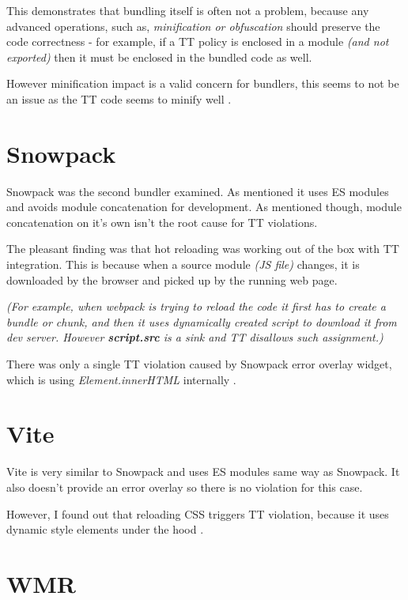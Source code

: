 This demonstrates that bundling itself is often not a problem, because any advanced operations, such
as, \emph{minification or obfuscation} should preserve the code correctness - for example, if a TT
policy is enclosed in a module \emph{(and not exported)} then it must be enclosed in the bundled
code as well.

However minification impact is a valid concern for bundlers, this seems to not be an issue as the TT
code seems to minify well \cite{tt_webpack_integration_minification}.

\section{Snowpack}

Snowpack was the second bundler examined. As mentioned it uses ES modules and avoids module
concatenation for development. As mentioned though, module concatenation on it's own isn't the root
cause for TT violations.

The pleasant finding was that hot reloading was working out of the box with TT integration. This is
because when a source module \emph{(JS file)} changes, it is downloaded by the browser and picked up
by the running web page.

\emph{(For example, when webpack is trying to reload the code it first has to create a bundle or
  chunk, and then it uses dynamically created script to download it from dev server. However
  \textbf{script.src} is a sink and TT disallows such assignment.)}

There was only a single TT violation caused by Snowpack error overlay widget, which is using
\emph{Element.innerHTML} internally \cite{snowpack_violation}.

\section{Vite}

Vite is very similar to Snowpack and uses ES modules same way as Snowpack. It also doesn't provide
an error overlay so there is no violation for this case.

However, I found out that reloading CSS triggers TT violation, because it uses dynamic style
elements under the hood \cite{vite_violation}.

\section{WMR}

